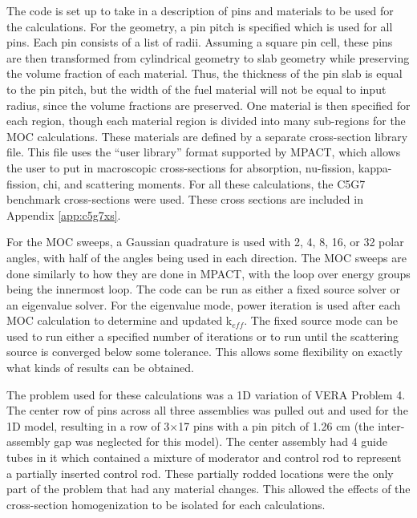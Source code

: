 The code is set up to take in a description of pins and materials to be used for the calculations.  For the geometry, a pin pitch is specified which is used for all pins.  Each pin consists of a list of radii.  Assuming a square pin cell, these pins are then transformed from cylindrical geometry to slab geometry while preserving the volume fraction of each material.  Thus, the thickness of the pin slab is equal to the pin pitch, but the width of the fuel material will not be equal to input radius, since the volume fractions are preserved.  One material is then specified for each region, though each material region is divided into many sub-regions for the MOC calculations.  These materials are defined by a separate cross-section library file.  This file uses the ``user library'' format supported by MPACT, which allows the user to put in macroscopic cross-sections for absorption, nu-fission, kappa-fission, chi, and scattering moments.  For all these calculations, the C5G7 benchmark cross-sections \cite{EELewisC5G72003,EELewisC5G7extended2005} were used.  These cross sections are included in Appendix \ref{app:c5g7xs}.

For the MOC sweeps, a Gaussian quadrature \cite{HandbookOfMathFunctions1972} is used with 2, 4, 8, 16, or 32 polar angles, with half of the angles being used in each direction.  The MOC sweeps are done similarly to how they are done in MPACT, with the loop over energy groups being the innermost loop.  The code can be run as either a fixed source solver or an eigenvalue solver.  For the eigenvalue mode, power iteration is used after each MOC calculation to determine and updated k$_{eff}$.  The fixed source mode can be used to run either a specified number of iterations or to run until the scattering source is converged below some tolerance.  This allows some flexibility on exactly what kinds of results can be obtained.

The problem used for these calculations was a 1D variation of VERA Problem 4.  The center row of pins across all three assemblies was pulled out and used for the 1D model, resulting in a row of 3$\times$17 pins with a pin pitch of 1.26 cm (the inter-assembly gap was neglected for this model).  The center assembly had 4 guide tubes in it which contained a mixture of moderator and control rod to represent a partially inserted control rod.  These partially rodded locations were the only part of the problem that had any material changes.  This allowed the effects of the cross-section homogenization to be isolated for each calculations.

